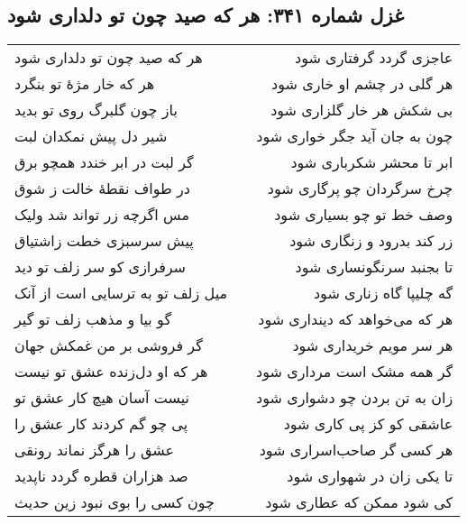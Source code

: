 \begin{center}
\section*{غزل شماره ۳۴۱: هر که صید چون تو دلداری شود}
\label{sec:341}
\begin{longtable}{l p{0.5cm} r}
هر که صید چون تو دلداری شود
&&
عاجزی گردد گرفتاری شود
\\
هر که خار مژهٔ تو بنگرد
&&
هر گلی در چشم او خاری شود
\\
باز چون گلبرگ روی تو بدید
&&
بی شکش هر خار گلزاری شود
\\
شیر دل پیش نمکدان لبت
&&
چون به جان آید جگر خواری شود
\\
گر لبت در ابر خندد همچو برق
&&
ابر تا محشر شکرباری شود
\\
در طواف نقطهٔ خالت ز شوق
&&
چرخ سرگردان چو پرگاری شود
\\
مس اگرچه زر تواند شد ولیک
&&
وصف خط تو چو بسیاری شود
\\
پیش سرسبزی خطت زاشتیاق
&&
زر کند بدرود و زنگاری شود
\\
سرفرازی کو سر زلف تو دید
&&
تا بجنبد سرنگونساری شود
\\
میل زلف تو به ترسایی است از آنک
&&
گه چلیپا گاه زناری شود
\\
گو بیا و مذهب زلف تو گیر
&&
هر که می‌خواهد که دینداری شود
\\
گر فروشی بر من غمکش جهان
&&
هر سر مویم خریداری شود
\\
هر که او دل‌زنده عشق تو نیست
&&
گر همه مشک است مرداری شود
\\
نیست آسان هیچ کار عشق تو
&&
زان به تن بردن چو دشواری شود
\\
پی چو گم کردند کار عشق را
&&
عاشقی کو کز پی کاری شود
\\
عشق را هرگز نماند رونقی
&&
هر کسی گر صاحب‌اسراری شود
\\
صد هزاران قطره گردد ناپدید
&&
تا یکی زان در شهواری شود
\\
چون کسی را بوی نبود زین حدیث
&&
کی شود ممکن که عطاری شود
\\
\end{longtable}
\end{center}
